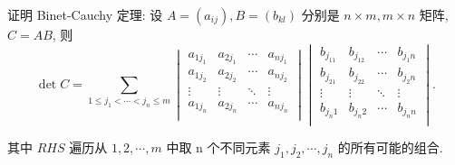 \documentclass{ctexart}
\begin{document}
\begin{exercise}[3.6]\label{ex3.6}
    证明 Binet-Cauchy 定理: 设 $A=(a_{ij}),B=(b_{kl})$ 分别是 $n\times m,m\times n$ 矩阵, $C=AB$, 则
    \[\det C=\sum\limits_{1\leq j_1<\cdots<j_n\leq m}\begin{vmatrix}
        a_{1j_1} & a_{2j_1} & \cdots & a_{nj_1} \\
        a_{1j_2} & a_{2j_2} & \cdots & a_{nj_2} \\
        \vdots & \vdots & \ddots & \vdots \\
        a_{1j_n} & a_{2j_n} & \cdots & a_{nj_n} \\
    \end{vmatrix}\begin{vmatrix}
        b_{j_11} & b_{j_12} & \cdots & b_{j_1n} \\
        b_{j_21} & b_{j_22} & \cdots & b_{j_2n} \\
        \vdots & \vdots & \ddots & \vdots \\
        b_{j_n1} & b_{j_n2} & \cdots & b_{j_nn} \\
    \end{vmatrix}.\]

    其中 $RHS$ 遍历从 $1,2,\cdots,m$ 中取 n 个不同元素 $j_1,j_2,\cdots,j_n$ 的所有可能的组合.
\end{exercise}
\end{document}
